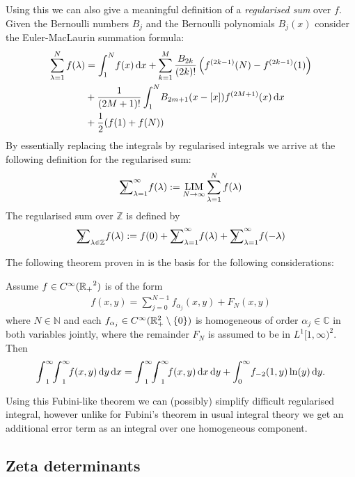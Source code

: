 Using this we can also give a meaningful definition of a \emph{regularised sum}
over $f$. Given the Bernoulli numbers $B_j$ and the Bernoulli polynomials
$B_j(x)$ consider the Euler-MacLaurin summation formula:
\begin{align*}
  \sum_{\lambda=1}^N f(\lambda) &= \Integ[N]{1}{x}{f(x)}
  + \sum_{k=1}^M \frac{B_{2k}}{(2k)!}\left(f^{(2k-1)}(N) - f^{(2k-1)}(1)\right)
  \\
  &\mathbin{+} \frac1{(2M + 1)!}\Integ[N]{1}{x}{B_{2m+1}(x-[x])f^{(2M+1)}(x)}
  \\
  &\mathbin{+} \frac12(f(1)+f(N))
\end{align*}
By essentially replacing the integrals by regularised integrals we arrive at the
following definition for the regularised sum:
\begin{align*}
  \Regsum_{\lambda=1}^\infty f(\lambda) := \Reglim_{N\to\infty} \sum_{\lambda=1}^N
  f(\lambda)
\end{align*}
The regularised sum over $\mathbb{Z}$ is defined by
\begin{align*}
  \Regsum_{\lambda\in\mathbb{Z}} f(\lambda) := f(0) + \Regsum_{\lambda=1}^\infty
  f(\lambda) + \Regsum_{\lambda=1}^\infty f(-\lambda)
\end{align*}

The following theorem proven in \cite{LV12} is the basis for the following
considerations:
\begin{Theorem}
  \label{thm:fubini}
  Assume $f\in\Cinf(\Rplus^2)$ is of the form
  \begin{align*}
    f(x,y) = \sum_{j=0}^{N-1} f_{\alpha_j}(x,y) + F_N(x,y)
  \end{align*}
  where $N\in\mathbb{N}$ and each $f_{\alpha_j}\in\Cinf(\mathbb{R}_+^2\setminus\{0\})$
  is homogeneous of order $\alpha_j\in\mathbb{C}$ in both variables jointly,
  where the remainder $F_N$ is assumed to be in $L^1[1,\infty)^2$. Then
  \begin{align}
    \Regint{x}{\Regint{y}{f(x,y)}} =
    \Regint{y}{\Regint{x}{f(x,y)}} + \Integ[\infty]{0}{y}{f_{-2}(1,y)\ln(y)}.
  \end{align}
\end{Theorem}
Using this Fubini-like theorem we can (possibly) simplify difficult regularised
integral, however unlike for Fubini's theorem in usual integral theory we get an
additional error term as an integral over one homogeneous component. 

\subsection{Zeta determinants}
    
